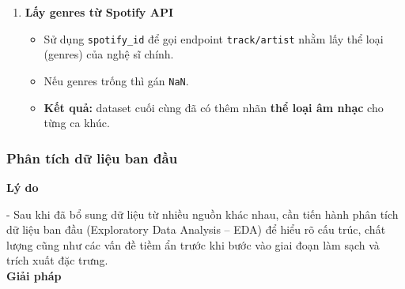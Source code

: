 \begin{enumerate}
    \item \textbf{Lấy genres từ Spotify API}
    \begin{itemize}
        \item Sử dụng \texttt{spotify\_id} để gọi endpoint \texttt{track/artist} nhằm lấy thể loại (genres) của nghệ sĩ chính.
        \item Nếu genres trống thì gán \texttt{NaN}.
        \item  \textbf{Kết quả:} dataset cuối cùng đã có thêm nhãn \textbf{thể loại âm nhạc} cho từng ca khúc.
    \end{itemize}


    
\end{enumerate}


    \subsubsection{Phân tích dữ liệu ban đầu}
    
    \textbf{Lý do} 
    
    - Sau khi đã bổ sung dữ liệu từ nhiều nguồn khác nhau, cần tiến hành phân tích dữ liệu ban đầu (Exploratory Data Analysis – EDA) 
    để hiểu rõ cấu trúc, chất lượng cũng như các vấn đề tiềm ẩn trước khi bước vào giai đoạn làm sạch và trích xuất đặc trưng. \\
    
    \textbf{Giải pháp} 
    
